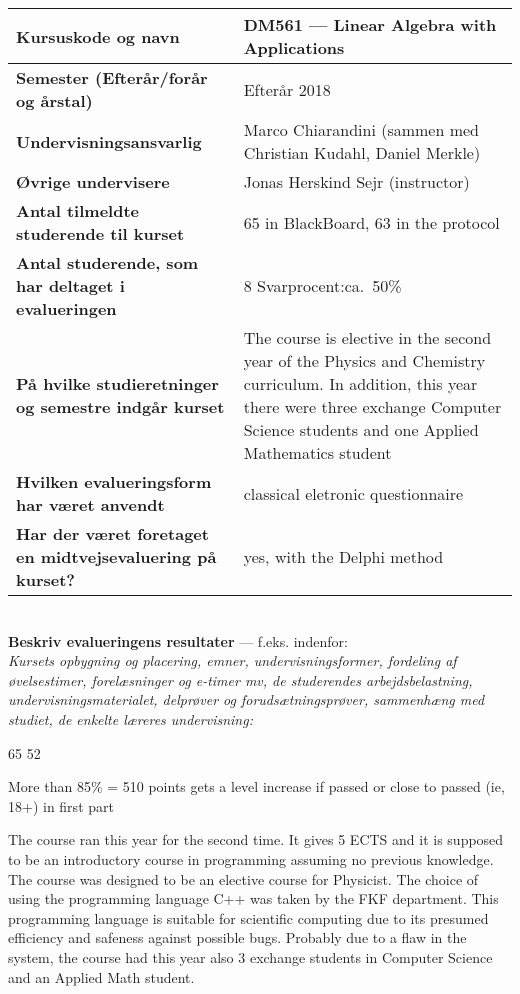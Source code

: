\documentclass[11pt]{article}
\begin{document}
\tabulinesep=1.2mm
\begin{tabu} to 1.0 \hline
Kursuskode og navn &  DM561 --- Linear Algebra with Applications \\\hline
Semester {\normalfont (Efterår/forår og årstal)} & Efterår 2018 \\\hline
Undervisnings\-ansvarlig &  Marco Chiarandini (sammen med Christian Kudahl, Daniel Merkle)  \\\hline
Øvrige undervisere &   Jonas Herskind Sejr (instructor) \\\hline
Antal tilmeldte studerende til kurset & 65 in BlackBoard, 63 in the protocol \\\hline
Antal studerende, som har deltaget i evalueringen &  8  \hfill
Svarprocent:ca.~50\% \\\hline
På hvilke studieretninger og semestre indgår kurset &  The course is elective in the second year of the Physics and Chemistry curriculum. In addition, this year there were three exchange Computer Science students and one Applied Mathematics student \\\hline
Hvilken evalueringsform har været anvendt &  classical eletronic questionnaire \\\hline
Har der været foretaget en midtvejsevaluering på kurset? &  yes, with the Delphi method  \\ 
\hline
\end{tabu}

~\\[1cm]\textcolor{sdublue}{{\bf Beskriv evalueringens resultater} ---
  f.eks. indenfor:\\ {\small \em Kursets opbygning og placering,
    emner, undervisningsformer, fordeling af øvelsestimer,
    forelæsninger og e-timer mv, de studerendes arbejdsbelastning,
    undervisningsmaterialet, delprøver og forudsætningsprøver,
    sammenhæng med studiet, de enkelte læreres undervisning:}}


65 52

More than 85\% = 510 points gets a level increase if passed or close to
passed (ie, 18+) in first part



The course ran this year for the second time. It gives 5 ECTS and it is
supposed to be an introductory course in programming assuming no
previous knowledge. The course was designed to be an elective course for
Physicist. The choice of using the programming language C++ was taken by
the FKF department. This programming language is suitable for scientific
computing due to its presumed efficiency and safeness against possible
bugs. Probably due to a flaw in the system, the course had this year
also 3 exchange students in Computer Science and an Applied Math
student.
\end{document}
